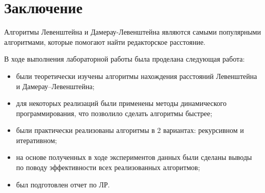 \chapter*{Заключение}

Алгоритмы Левенштейна и Дамерау-Левенштейна являются самыми популярными алгоритмами, которые помогают найти редакторское расстояние.

В ходе выполнения лабораторной работы была проделана следующая работа:

\begin{itemize}
    \item были теоретически изучены алгоритмы нахождения расстояний Левенштейна и Дамерау--Левенштейна;
	\item для некоторых реализаций были применены методы динамического программирования, что позволило сделать алгоритмы быстрее;
	\item были практически реализованы алгоритмы в 2 вариантах: рекурсивном и итеративном;
	\item на основе полученных в ходе экспериментов данных были сделаны выводы по поводу эффективности всех реализованных алгоритмов;
	\item был подготовлен отчет по ЛР.
\end{itemize}
